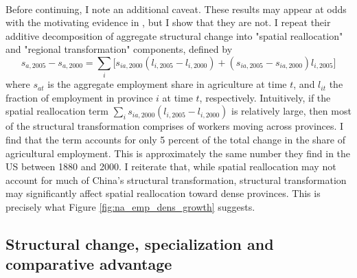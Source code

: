 \documentclass[]{article}
\theoremstyle{plain}
\begin{document}
\paragraph*{}
Before continuing, I note an additional caveat. These results may appear at odds with the motivating evidence in \cite{eckertpeters}, but I show that they are not. I repeat their additive decomposition of aggregate structural change into "spatial reallocation" and "regional transformation" components, defined by
\begin{equation}
	s_{a, 2005} - s_{a, 2000} = \sum_{i}\big[s_{ia, 2000}(l_{i, 2005} - l_{i, 2000}) + (s_{ia, 2005} - s_{ia, 2000})l_{i, 2005}\bigg]
\end{equation}
where $s_{at}$ is the aggregate employment share in agriculture at time $t$, and $l_{it}$ the fraction of employment in province $i$ at time $t$, respectively. Intuitively, if the spatial reallocation term $\sum_{i}s_{ia, 2000}(l_{i, 2005} - l_{i, 2000})$ is relatively large, then most of the structural transformation comprises of workers moving across provinces. I find that the term  accounts for only 5 percent of the total change in the share of agricultural employment. This is approximately the same number they find in the US between 1880 and 2000. I reiterate that, while spatial reallocation may not account for much of China's structural transformation, structural transformation may significantly affect spatial reallocation toward dense provinces. This is precisely what Figure \ref{fig:na_emp_dens_growth} suggests.

 
\subsection*{Structural change, specialization and comparative advantage}
\end{document}
